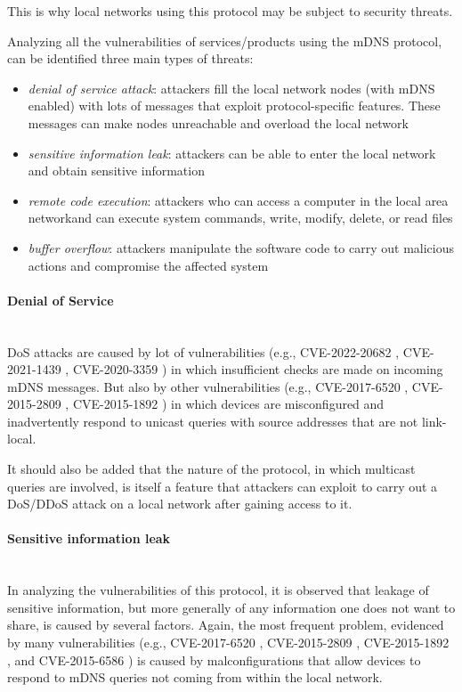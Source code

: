 \documentclass[fleqn, 11pt]{SelfArx} %
\begin{document}
This is why local networks using this protocol may be subject to security threats. 

Analyzing all the vulnerabilities of services/products using the mDNS protocol, can be identified three main types of threats:
\begin{itemize}[leftmargin=*]
	\item {\it{denial of service attack}}: attackers fill the local network nodes (with mDNS enabled) with lots of messages that exploit protocol-specific features. These messages can make nodes unreachable and overload the local network
	\item {\it{sensitive information leak}}: attackers can be able to enter the local network and obtain sensitive information
	\item {\it{remote code execution}}: attackers who can access a computer in the local area networkand can execute system commands, write, modify, delete, or read files
	\item {\it{buffer overflow}}: attackers manipulate the software code to carry out malicious actions and compromise the affected system 
\end{itemize}

\paragraph{Denial of Service}\mbox{}\\
DoS attacks are caused by lot of vulnerabilities (e.g., CVE-2022-20682 \cite{CVE-2022-20682}, CVE-2021-1439 \cite{CVE-2021-1439}, CVE-2020-3359 \cite{CVE-2020-3359}) in which insufficient checks are made on incoming mDNS messages. But also by other vulnerabilities (e.g., CVE-2017-6520 \cite{CVE-2017-6520}, CVE-2015-2809 \cite{CVE-2015-2809}, CVE-2015-1892 \cite{CVE-2015-1892}) in which devices are misconfigured and inadvertently respond to unicast queries with source addresses that are not link-local.

It should also be added that the nature of the protocol, in which multicast queries are involved, is itself a feature that attackers can exploit to carry out a DoS/DDoS attack on a local network after gaining access to it. 

\paragraph{Sensitive information leak}\mbox{}\\
In analyzing the vulnerabilities of this protocol, it is observed that leakage of sensitive information, but more generally of any information one does not want to share, is caused by several factors. Again, the most frequent problem, evidenced by many vulnerabilities (e.g., CVE-2017-6520 \cite{CVE-2017-6520}, CVE-2015-2809 \cite{CVE-2015-2809}, CVE-2015-1892 \cite{CVE-2015-1892}, and CVE-2015-6586 \cite{CVE-2015-6586}) is caused by malconfigurations that allow devices to respond to mDNS queries not coming from within the local network. 
\end{document}
